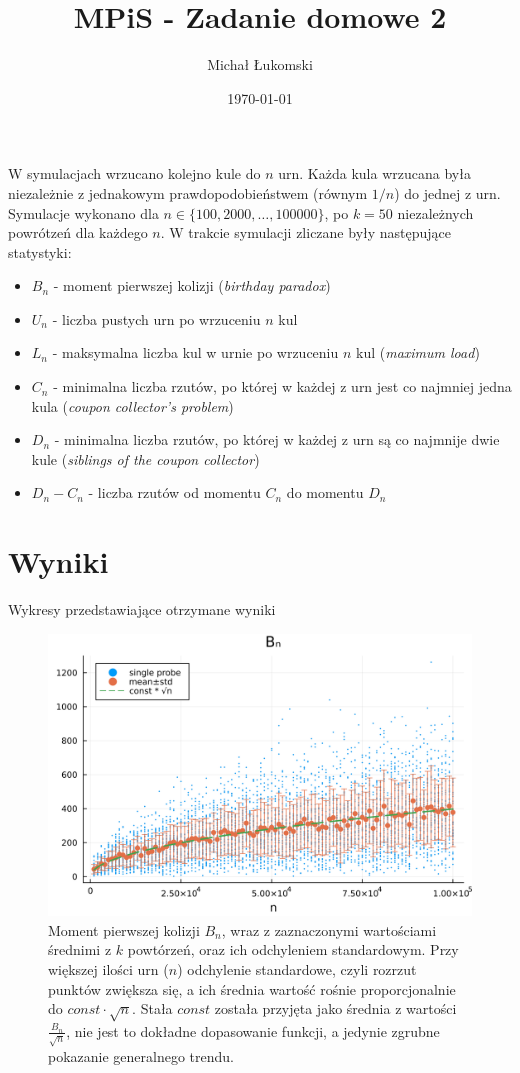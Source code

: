 \documentclass{article}
\title{MPiS - Zadanie domowe 2}
\author{Michał Łukomski}
\date{\today}
\begin{document}
\maketitle

W symulacjach wrzucano kolejno kule do $n$ urn. Każda kula wrzucana była niezależnie z jednakowym prawdopodobieństwem (równym $1/n$) do jednej z urn. Symulacje wykonano dla $n \in \{100, 2000, \dots, 100000\}$, po $k=50$ niezależnych powrótzeń dla każdego $n$. W trakcie symulacji zliczane były następujące statystyki:
\begin{itemize}
    \item $B_n$ - moment pierwszej kolizji (\textit{birthday paradox})
    \item $U_n$ - liczba pustych urn po wrzuceniu $n$ kul
    \item $L_n$ - maksymalna liczba kul w urnie po wrzuceniu $n$ kul (\textit{maximum load})
    \item $C_n$ - minimalna liczba rzutów, po której w każdej z urn jest co najmniej jedna kula (\textit{coupon collector's problem})
    \item $D_n$ - minimalna liczba rzutów, po której w każdej z urn są co najmnije dwie kule (\textit{siblings of the coupon collector})
    \item $D_n - C_n$ - liczba rzutów od momentu $C_n$ do momentu $D_n$
\end{itemize}

\newpage
\section{Wyniki}
Wykresy przedstawiające otrzymane wyniki

\begin{figure}[h]
    \centering
    \includegraphics[width=1.0\textwidth]{../results/B_n.png}
    \caption{Moment pierwszej kolizji $B_n$, wraz z zaznaczonymi wartościami średnimi z $k$ powtórzeń, oraz ich odchyleniem standardowym. Przy większej ilości urn ($n$) odchylenie standardowe, czyli rozrzut punktów zwiększa się, a ich średnia wartość rośnie proporcjonalnie do $const \cdot \sqrt{n}$. Stała $const$ została przyjęta jako średnia z wartości $\frac{B_n}{\sqrt{n}}$, nie jest to dokładne dopasowanie funkcji, a jedynie zgrubne pokazanie generalnego trendu.}
    \label{fig:B_n}
\end{figure}
\end{document}
